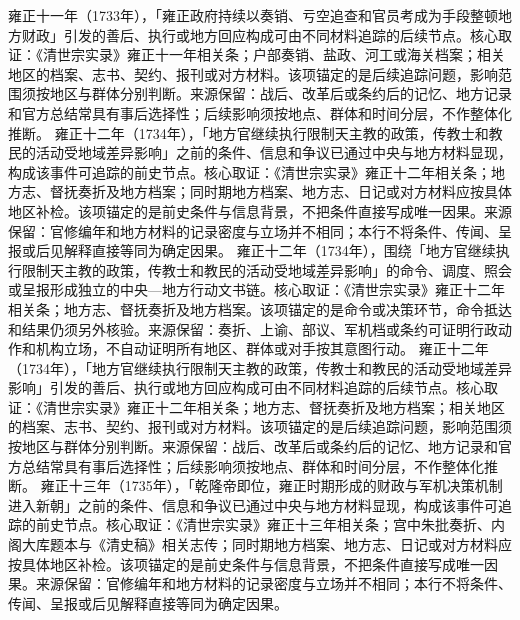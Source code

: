 雍正十一年（1733年），「雍正政府持续以奏销、亏空追查和官员考成为手段整顿地方财政」引发的善后、执行或地方回应构成可由不同材料追踪的后续节点。核心取证：《清世宗实录》雍正十一年相关条；户部奏销、盐政、河工或海关档案；相关地区的档案、志书、契约、报刊或对方材料。该项锚定的是后续追踪问题，影响范围须按地区与群体分别判断。来源保留：战后、改革后或条约后的记忆、地方记录和官方总结常具有事后选择性；后续影响须按地点、群体和时间分层，不作整体化推断。
雍正十二年（1734年），「地方官继续执行限制天主教的政策，传教士和教民的活动受地域差异影响」之前的条件、信息和争议已通过中央与地方材料显现，构成该事件可追踪的前史节点。核心取证：《清世宗实录》雍正十二年相关条；地方志、督抚奏折及地方档案；同时期地方档案、地方志、日记或对方材料应按具体地区补检。该项锚定的是前史条件与信息背景，不把条件直接写成唯一因果。来源保留：官修编年和地方材料的记录密度与立场并不相同；本行不将条件、传闻、呈报或后见解释直接等同为确定因果。
雍正十二年（1734年），围绕「地方官继续执行限制天主教的政策，传教士和教民的活动受地域差异影响」的命令、调度、照会或呈报形成独立的中央—地方行动文书链。核心取证：《清世宗实录》雍正十二年相关条；地方志、督抚奏折及地方档案。该项锚定的是命令或决策环节，命令抵达和结果仍须另外核验。来源保留：奏折、上谕、部议、军机档或条约可证明行政动作和机构立场，不自动证明所有地区、群体或对手按其意图行动。
雍正十二年（1734年），「地方官继续执行限制天主教的政策，传教士和教民的活动受地域差异影响」引发的善后、执行或地方回应构成可由不同材料追踪的后续节点。核心取证：《清世宗实录》雍正十二年相关条；地方志、督抚奏折及地方档案；相关地区的档案、志书、契约、报刊或对方材料。该项锚定的是后续追踪问题，影响范围须按地区与群体分别判断。来源保留：战后、改革后或条约后的记忆、地方记录和官方总结常具有事后选择性；后续影响须按地点、群体和时间分层，不作整体化推断。
雍正十三年（1735年），「乾隆帝即位，雍正时期形成的财政与军机决策机制进入新朝」之前的条件、信息和争议已通过中央与地方材料显现，构成该事件可追踪的前史节点。核心取证：《清世宗实录》雍正十三年相关条；宫中朱批奏折、内阁大库题本与《清史稿》相关志传；同时期地方档案、地方志、日记或对方材料应按具体地区补检。该项锚定的是前史条件与信息背景，不把条件直接写成唯一因果。来源保留：官修编年和地方材料的记录密度与立场并不相同；本行不将条件、传闻、呈报或后见解释直接等同为确定因果。
